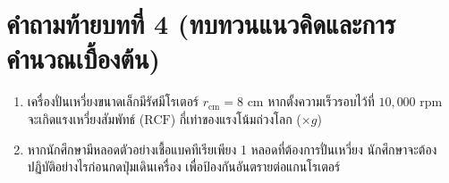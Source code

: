 \section*{คำถามท้ายบทที่ 4 (ทบทวนแนวคิดและการคำนวณเบื้องต้น)}
\begin{enumerate}
    \item เครื่องปั่นเหวี่ยงขนาดเล็กมีรัศมีโรเตอร์ $r_{\text{cm}} = 8\text{ cm}$ หากตั้งความเร็วรอบไว้ที่ $10{,}000\text{ rpm}$ จะเกิดแรงเหวี่ยงสัมพัทธ์ ($\text{RCF}$) กี่เท่าของแรงโน้มถ่วงโลก ($\times g$)
    \item หากนักศึกษามีหลอดตัวอย่างเชื้อแบคทีเรียเพียง 1 หลอดที่ต้องการปั่นเหวี่ยง นักศึกษาจะต้องปฏิบัติอย่างไรก่อนกดปุ่มเดินเครื่อง เพื่อป้องกันอันตรายต่อแกนโรเตอร์
\end{enumerate}
